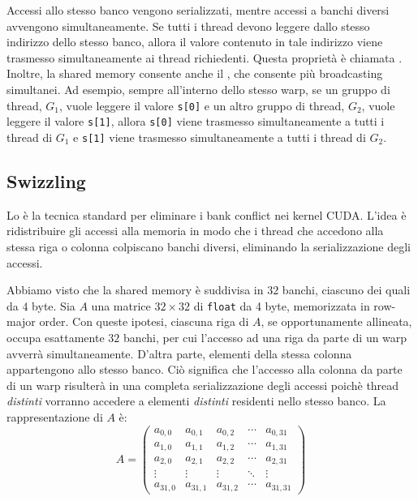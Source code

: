 Accessi allo stesso banco vengono serializzati, mentre accessi a banchi diversi avvengono simultaneamente.
Se tutti i thread devono leggere dallo stesso indirizzo dello stesso banco, allora il valore contenuto in tale indirizzo viene trasmesso simultaneamente ai thread richiedenti. Questa proprietà è chiamata .
Inoltre, la shared memory consente anche il , che consente più broadcasting simultanei.
Ad esempio, sempre all'interno dello stesso warp, se un gruppo di thread, \(G_{1}\), vuole leggere il valore \texttt{s[0]} e un altro gruppo di thread, \(G_{2}\), vuole leggere il valore \texttt{s[1]}, allora \texttt{s[0]} viene trasmesso simultaneamente a tutti i thread di \(G_{1}\) e \texttt{s[1]} viene trasmesso simultaneamente a tutti i thread di \(G_{2}\).

\subsection{Swizzling}
Lo  è la tecnica standard per eliminare i bank conflict nei kernel CUDA. 
L'idea è ridistribuire gli accessi alla memoria in modo che i thread che accedono alla stessa riga o colonna colpiscano banchi diversi, eliminando la serializzazione degli accessi. %

Abbiamo visto che la shared memory è suddivisa in \(32\) banchi, ciascuno dei quali da \(4\) byte.
Sia \(A\) una matrice \(32\times 32\) di \texttt{float} da 4 byte, memorizzata in row-major order.
Con queste ipotesi, ciascuna riga di \(A\), se opportunamente allineata, occupa esattamente \(32\) banchi, per cui l'accesso ad una riga da parte di un warp avverrà simultaneamente.
D'altra parte, elementi della stessa colonna appartengono allo stesso banco.
Ciò significa che l'accesso alla colonna da parte di un warp risulterà in una completa serializzazione degli accessi poichè thread \emph{distinti} vorranno accedere a elementi \emph{distinti} residenti nello stesso banco.
La rappresentazione di \(A\) è:
\[
A = \begin{pmatrix}
a_{0,0} & a_{0,1} & a_{0,2} & \cdots & a_{0,31} \\
a_{1,0} & a_{1,1} & a_{1,2} & \cdots & a_{1,31} \\
a_{2,0} & a_{2,1} & a_{2,2} & \cdots & a_{2,31} \\
\vdots & \vdots & \vdots & \ddots & \vdots \\
a_{31,0} & a_{31,1} & a_{31,2} & \cdots & a_{31,31}
\end{pmatrix}
\]

